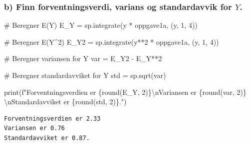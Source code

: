 \documentclass[
  12pt,
  a4paper,
  DIV=11,
  numbers=noendperiod]{scrartcl}
\newenvironment{Shaded}{\begin{snugshade}}{\end{snugshade}}
\newcommand{\BuiltInTok}[1]{\textcolor[rgb]{0.00,0.23,0.31}{#1}}
\newcommand{\CharTok}[1]{\textcolor[rgb]{0.13,0.47,0.30}{#1}}
\newcommand{\CommentTok}[1]{\textcolor[rgb]{0.37,0.37,0.37}{#1}}
\newcommand{\DecValTok}[1]{\textcolor[rgb]{0.68,0.00,0.00}{#1}}
\newcommand{\NormalTok}[1]{\textcolor[rgb]{0.00,0.23,0.31}{#1}}
\newcommand{\OperatorTok}[1]{\textcolor[rgb]{0.37,0.37,0.37}{#1}}
\newcommand{\SpecialCharTok}[1]{\textcolor[rgb]{0.37,0.37,0.37}{#1}}
\newcommand{\SpecialStringTok}[1]{\textcolor[rgb]{0.13,0.47,0.30}{#1}}
\begin{document}
\subsubsection{\texorpdfstring{b) Finn forventningsverdi, varians og
standardavvik for
\(Y\).}{b) Finn forventningsverdi, varians og standardavvik for Y.}}\label{b-finn-forventningsverdi-varians-og-standardavvik-for-y.}

\begin{Shaded}
\begin{Highlighting}[]
\CommentTok{\# Beregner E(Y)}
\NormalTok{E\_Y }\OperatorTok{=}\NormalTok{ sp.integrate(y }\OperatorTok{*}\NormalTok{ oppgave1a, (y, }\DecValTok{1}\NormalTok{, }\DecValTok{4}\NormalTok{))}

\CommentTok{\# Beregner E(Y\^{}2)}
\NormalTok{E\_Y2 }\OperatorTok{=}\NormalTok{ sp.integrate(y}\OperatorTok{**}\DecValTok{2} \OperatorTok{*}\NormalTok{ oppgave1a, (y, }\DecValTok{1}\NormalTok{, }\DecValTok{4}\NormalTok{))}

\CommentTok{\# Beregner variansen for Y}
\NormalTok{var }\OperatorTok{=}\NormalTok{ E\_Y2 }\OperatorTok{{-}}\NormalTok{ E\_Y}\OperatorTok{**}\DecValTok{2}

\CommentTok{\# Beregner standardavviket for Y}
\NormalTok{std }\OperatorTok{=}\NormalTok{ sp.sqrt(var)}

\BuiltInTok{print}\NormalTok{(}\SpecialStringTok{f"Forventningsverdien er }\SpecialCharTok{\{}\BuiltInTok{round}\NormalTok{(E\_Y, }\DecValTok{2}\NormalTok{)}\SpecialCharTok{\}}\CharTok{\textbackslash{}n}\SpecialStringTok{Variansen er }\SpecialCharTok{\{}\BuiltInTok{round}\NormalTok{(var, }\DecValTok{2}\NormalTok{)}\SpecialCharTok{\}}\SpecialStringTok{ }\CharTok{\textbackslash{}n}\SpecialStringTok{Standardavviket er }\SpecialCharTok{\{}\BuiltInTok{round}\NormalTok{(std, }\DecValTok{2}\NormalTok{)}\SpecialCharTok{\}}\SpecialStringTok{."}\NormalTok{)}
\end{Highlighting}
\end{Shaded}

\begin{verbatim}
Forventningsverdien er 2.33
Variansen er 0.76 
Standardavviket er 0.87.
\end{verbatim}
\end{document}
